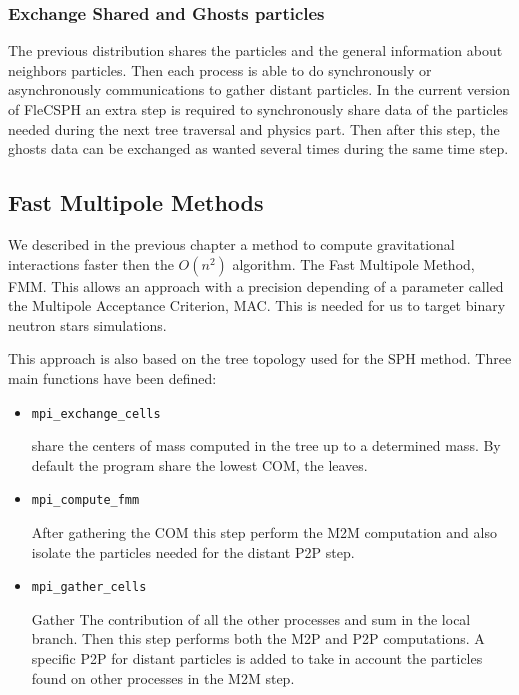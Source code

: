 \subsubsection{Exchange Shared and Ghosts particles}

The previous distribution shares the particles and the general information about neighbors particles. 
Then each process is able to do synchronously or asynchronously communications to gather distant particles. 
In the current version of FleCSPH an extra step is required to synchronously share data of the particles needed during the next tree traversal and physics part. 
Then after this step, the ghosts data can be exchanged as wanted several times during the same time step. 

\subsection{Fast Multipole Methods}

We described in the previous chapter a method to compute gravitational interactions faster then the $O(n^2)$ algorithm.
The Fast Multipole Method, FMM.
This allows an approach with a precision depending of a parameter called the Multipole Acceptance Criterion, MAC. 
This is needed for us to target binary neutron stars simulations.

This approach is also based on the tree topology used for the SPH method. 
Three main functions have been defined: 
\begin{itemize}
	\item \begin{verbatim}mpi_exchange_cells\end{verbatim} share the centers of mass computed in the tree up to a determined mass. By default the program share the lowest COM, the leaves. 
	\item \begin{verbatim}mpi_compute_fmm\end{verbatim} After gathering the COM this step perform the M2M computation and also isolate the particles needed for the distant P2P step. 
	\item \begin{verbatim}mpi_gather_cells\end{verbatim} Gather The contribution of all the other processes and sum in the local branch.
	Then this step performs both the M2P and P2P computations. 
	A specific P2P for distant particles is added to take in account the particles found on other processes in the M2M step.
\end{itemize}


